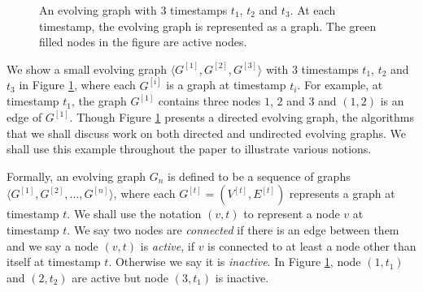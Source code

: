 \documentclass[11pt, conference, , compsocconf]{IEEEtran}
\theoremstyle{definition}
\begin{document}
\begin{figure}[h]
 \begin{center}
\end{center}
\caption{An evolving graph with 3 timestamps $t_1$, $t_2$ and $t_3$.
At each timestamp, the evolving graph is represented as a graph. 
The green filled nodes in the figure are active nodes.}
\label{fig:eg_shortest_path}
\end{figure}

We show a small evolving graph $ \langle G^{[1]}, G^{[2]}, G^{[3]}\rangle$ with $3$ timestamps $t_1$, $t_2$ and $t_3$ 
in Figure \ref{fig:eg_shortest_path}, where each $G^{[i]}$ is a graph at timestamp $t_i$. 
For example,
at timestamp $t_1$, the graph $G^{[1]}$ contains three nodes $1$, $2$ and $3$ and $(1,2)$ is an edge of $G^{[1]}$. 
Though Figure \ref{fig:eg_shortest_path} presents a 
directed evolving graph,  the algorithms that we shall discuss work on both 
directed and undirected evolving graphs.
We shall use this example throughout the paper to illustrate various
notions.

Formally, an evolving graph $G_n $ is defined to be a sequence of graphs $\langle G^{[1]}, G^{[2]}, \ldots, G^{[n]}\rangle$,  where each $G^{[t]} = (V^{[t]}, E^{[t]})$ represents a graph at timestamp $t$. 
We shall use the notation $(v, t)$ to represent
a node $v$ at timestamp $t$. 
We say two nodes are \emph{connected} if there is an edge between them
and we say a node $(v,t)$ is \emph{active}, if $v$ is connected to at least a node other than itself at timestamp $t$. Otherwise we say it is \emph{inactive}.  
In Figure \ref{fig:eg_shortest_path}, node $(1,t_1)$ and $(2,t_2)$  are active but node $(3,t_1)$ is inactive. 
\end{document}
